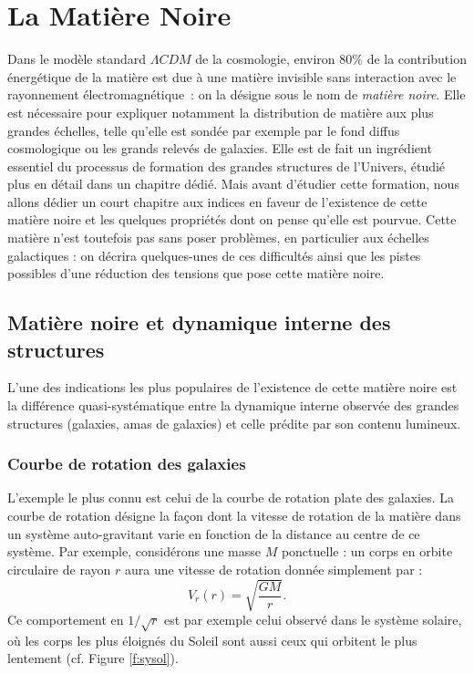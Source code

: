 \chapter{La Matière Noire}

Dans le modèle standard $\Lambda CDM$ de la cosmologie, environ $80\%$ de la contribution énergétique de la matière est due à une matière invisible sans interaction avec le rayonnement électromagnétique~: on la désigne sous le nom de \textit{matière noire}. Elle est nécessaire pour expliquer notamment la distribution de matière aux plus grandes échelles, telle qu'elle est sondée par exemple par le fond diffus cosmologique ou les grands relevés de galaxies. Elle est de fait un ingrédient essentiel du processus de formation des grandes structures de l'Univers, étudié plus en détail dans un chapitre dédié. Mais avant d'étudier cette formation, nous allons dédier un court chapitre aux indices en faveur de l'existence de cette matière noire et les quelques propriétés dont on pense qu'elle est pourvue. Cette matière n'est toutefois pas sans poser problèmes, en particulier aux échelles galactiques : on décrira quelques-unes de ces difficultés ainsi que les pistes possibles d'une réduction des tensions que pose cette matière noire.

\section{Matière noire et dynamique interne des structures}
L'une des indications les plus populaires de l'existence de cette matière noire est la différence quasi-systématique entre la dynamique interne observée des grandes structures (galaxies, amas de galaxies) et celle prédite par son contenu lumineux.

\subsection{Courbe de rotation des galaxies}
L'exemple le plus connu est celui de la courbe de rotation plate des galaxies. La courbe de rotation désigne  la façon dont la vitesse de rotation de la matière dans un système auto-gravitant varie en fonction de la distance au centre de ce système. Par exemple, considérons une masse $M$ ponctuelle : un corps en orbite circulaire de rayon $r$ aura une vitesse de rotation donnée simplement par :
\begin{equation}
V_r(r)=\sqrt{\frac{GM}{r}}.
\end{equation} 
Ce comportement en $1/\sqrt{r}$ est par exemple celui observé dans le système solaire, où les corps les plus éloignés du Soleil sont aussi ceux qui orbitent le plus lentement (cf. Figure \ref{f:sysol}). 

